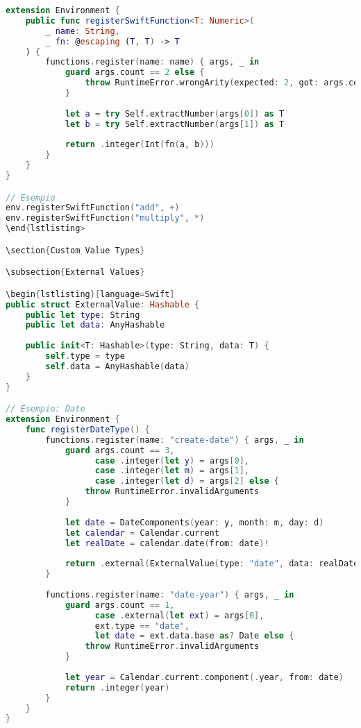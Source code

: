 \begin{lstlisting}[language=Swift]
extension Environment {
    public func registerSwiftFunction<T: Numeric>(
        _ name: String,
        _ fn: @escaping (T, T) -> T
    ) {
        functions.register(name: name) { args, _ in
            guard args.count == 2 else {
                throw RuntimeError.wrongArity(expected: 2, got: args.count)
            }
            
            let a = try Self.extractNumber(args[0]) as T
            let b = try Self.extractNumber(args[1]) as T
            
            return .integer(Int(fn(a, b)))
        }
    }
}

// Esempio
env.registerSwiftFunction("add", +)
env.registerSwiftFunction("multiply", *)
\end{lstlisting>

\section{Custom Value Types}

\subsection{External Values}

\begin{lstlisting}[language=Swift]
public struct ExternalValue: Hashable {
    public let type: String
    public let data: AnyHashable
    
    public init<T: Hashable>(type: String, data: T) {
        self.type = type
        self.data = AnyHashable(data)
    }
}

// Esempio: Date
extension Environment {
    func registerDateType() {
        functions.register(name: "create-date") { args, _ in
            guard args.count == 3,
                  case .integer(let y) = args[0],
                  case .integer(let m) = args[1],
                  case .integer(let d) = args[2] else {
                throw RuntimeError.invalidArguments
            }
            
            let date = DateComponents(year: y, month: m, day: d)
            let calendar = Calendar.current
            let realDate = calendar.date(from: date)!
            
            return .external(ExternalValue(type: "date", data: realDate))
        }
        
        functions.register(name: "date-year") { args, _ in
            guard args.count == 1,
                  case .external(let ext) = args[0],
                  ext.type == "date",
                  let date = ext.data.base as? Date else {
                throw RuntimeError.invalidArguments
            }
            
            let year = Calendar.current.component(.year, from: date)
            return .integer(year)
        }
    }
}
\end{lstlisting}

